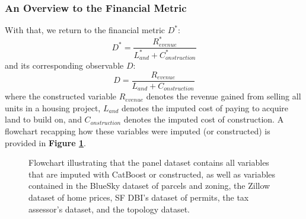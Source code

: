 \documentclass[a4paper,12pt]{article}
\begin{document}
\subsubsection{An Overview to the Financial Metric}
With that, we return to the financial metric $D^*$:
\[
D^* = \frac{R^{*}_{evenue}}{L^{*}_{and} + C^{*}_{onstruction}}
\]
and its corresponding observable $D$:
\[
D = \frac{R_{evenue}}{L_{and} + C_{onstruction}}
\]
where the constructed variable $R_{evenue}$ denotes the revenue gained from selling all units in a housing project, $L_{and}$ denotes the imputed cost of paying to acquire land to build on, and $C_{onstruction}$ denotes the imputed cost of construction. A flowchart recapping how these variables were imputed (or constructed) is provided in \textbf{Figure \ref{fig:flowchart}}.


\begin{figure}[bth]
\caption{Flowchart illustrating that the panel dataset contains all variables that are imputed with CatBoost or constructed, as well as variables contained in the BlueSky dataset of parcels and zoning, the Zillow dataset of home prices, SF DBI's dataset of permits, the tax assessor's dataset, and the topology dataset.}
\label{fig:flowchart}
\centering
{}
\end{figure}
\end{document}
